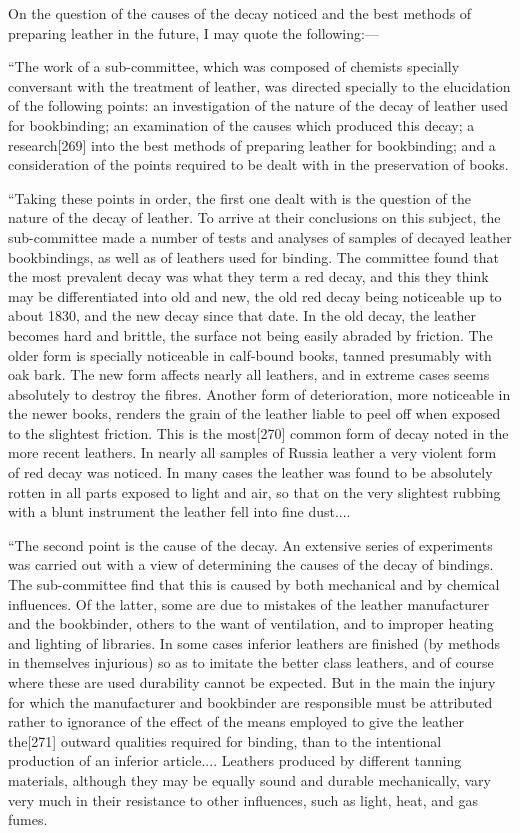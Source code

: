 \documentclass[
]{article}
\begin{document}
On the question of the causes of the decay noticed and the best methods
of preparing leather in the future, I may quote the following:---

``The work of a sub-committee, which was composed of chemists specially
conversant with the treatment of leather, was directed specially to the
elucidation of the following points: an investigation of the nature of
the decay of leather used for bookbinding; an examination of the causes
which produced this decay; a
research{\protect\hypertarget{Page_269}{}{{[}269{]}}} into the best
methods of preparing leather for bookbinding; and a consideration of the
points required to be dealt with in the preservation of books.

``Taking these points in order, the first one dealt with is the question
of the nature of the decay of leather. To arrive at their conclusions on
this subject, the sub-committee made a number of tests and analyses of
samples of decayed leather bookbindings, as well as of leathers used for
binding. The committee found that the most prevalent decay was what they
term a red decay, and this they think may be differentiated into old and
new, the old red decay being noticeable up to about 1830, and the new
decay since that date. In the old decay, the leather becomes hard and
brittle, the surface not being easily abraded by friction. The older
form is specially noticeable in calf-bound books, tanned presumably with
oak bark. The new form affects nearly all leathers, and in extreme cases
seems absolutely to destroy the fibres. Another form of deterioration,
more noticeable in the newer books, renders the grain of the leather
liable to peel off when exposed to the slightest friction. This is the
most{\protect\hypertarget{Page_270}{}{{[}270{]}}} common form of decay
noted in the more recent leathers. In nearly all samples of Russia
leather a very violent form of red decay was noticed. In many cases the
leather was found to be absolutely rotten in all parts exposed to light
and air, so that on the very slightest rubbing with a blunt instrument
the leather fell into fine dust....

``The second point is the cause of the decay. An extensive series of
experiments was carried out with a view of determining the causes of the
decay of bindings. The sub-committee find that this is caused by both
mechanical and by chemical influences. Of the latter, some are due to
mistakes of the leather manufacturer and the bookbinder, others to the
want of ventilation, and to improper heating and lighting of libraries.
In some cases inferior leathers are finished (by methods in themselves
injurious) so as to imitate the better class leathers, and of course
where these are used durability cannot be expected. But in the main the
injury for which the manufacturer and bookbinder are responsible must be
attributed rather to ignorance of the effect of the means employed to
give the leather the{\protect\hypertarget{Page_271}{}{{[}271{]}}}
outward qualities required for binding, than to the intentional
production of an inferior article.... Leathers produced by different
tanning materials, although they may be equally sound and durable
mechanically, vary very much in their resistance to other influences,
such as light, heat, and gas fumes.
\end{document}

